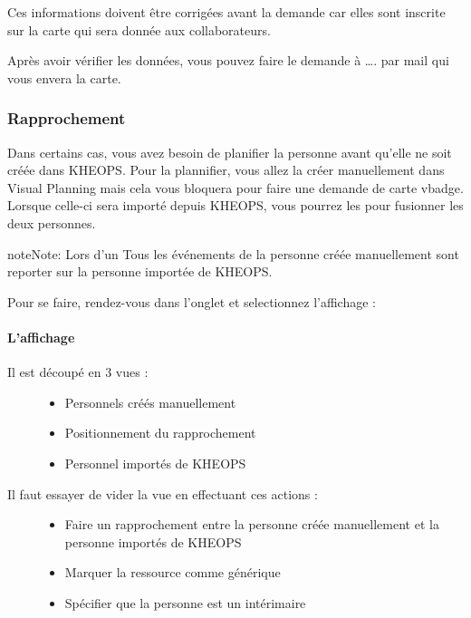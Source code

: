 \documentclass[letterpaper,10pt,english]{sphinxmanual}
\begin{document}
Ces informations doivent être corrigées avant la demande car elles sont inscrite sur la carte qui sera donnée aux collaborateurs.

Après avoir vérifier les données, vous pouvez faire le demande à …. par mail qui vous envera la carte.


\subsubsection{Rapprochement}
\label{\detokenize{fonctionnalitees/vbadge:rapprochement}}\label{\detokenize{fonctionnalitees/vbadge:id1}}
Dans certains cas, vous avez besoin de planifier la personne avant qu’elle ne soit créée dans KHEOPS.
Pour la plannifier, vous allez la créer manuellement dans Visual Planning mais cela vous bloquera pour faire une demande de carte vbadge.
Lorsque celle-ci sera importé depuis KHEOPS, vous pourrez les  pour fusionner les deux personnes.

\begin{sphinxadmonition}{note}{Note:}
Lors d’un  Tous les événements de la personne créée manuellement sont reporter sur la personne importée de KHEOPS.
\end{sphinxadmonition}

Pour se faire, rendez-vous dans l’onglet  et selectionnez l’affichage : 


\paragraph{L’affichage}
\label{\detokenize{fonctionnalitees/vbadge:l-affichage}}\begin{description}
\item[{Il est découpé en 3 vues :}] \leavevmode\begin{itemize}
\item {} 
Personnels créés manuellement

\item {} 
Positionnement du rapprochement

\item {} 
Personnel importés de KHEOPS

\end{itemize}

\item[{Il faut essayer de vider la vue  en effectuant ces actions :}] \leavevmode\begin{itemize}
\item {} 
Faire un rapprochement entre la personne créée manuellement et la personne importés de KHEOPS

\item {} 
Marquer la ressource comme générique

\item {} 
Spécifier que la personne est un intérimaire

\end{itemize}

\end{description}
\end{document}
